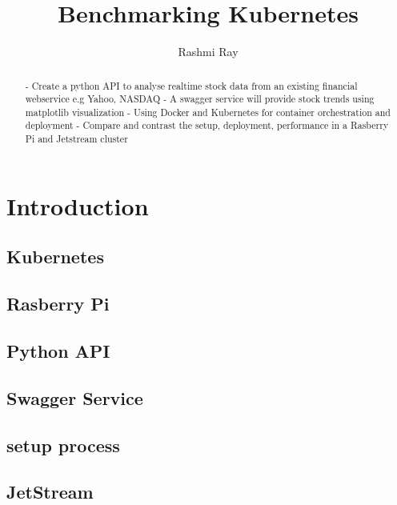 
\title{Benchmarking Kubernetes}

\author{Rashmi Ray}

\renewcommand{\shortauthors}{Uma Kugan}
\begin{abstract}
 - Create a python API to analyse realtime stock data from an existing financial webservice e.g Yahoo, NASDAQ
 - A swagger service will provide stock trends using matplotlib visualization
 - Using Docker and Kubernetes for container orchestration and deployment
 - Compare and contrast the setup, deployment, performance  in a Rasberry Pi and Jetstream cluster

\end{abstract}



\maketitle

\section{Introduction}


\subsection{Kubernetes}

\subsection{Rasberry Pi}

\subsection{Python API}
\subsection{Swagger Service}
\subsection{setup process}
\subsection{JetStream}

